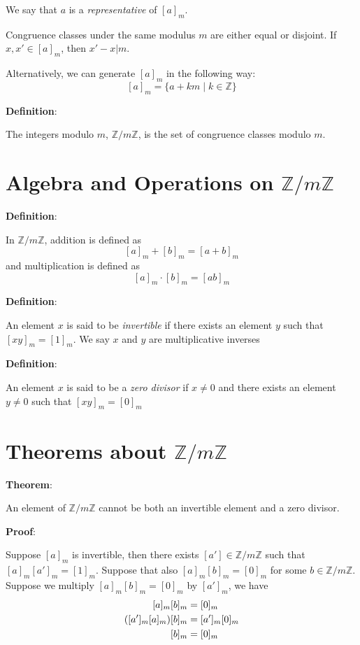 \documentclass{article}
\begin{document}
\begin{multicols*}{2}
We say that $a$ is a \textit{representative} of $[a]_m$. 

Congruence classes under the same modulus $m$ are either equal or disjoint. If $x, x' \in [a]_m$, then $x' - x | m$.

Alternatively, we can generate $[a]_m$ in the following way:\[[a]_m = \{a + km \;|\; k \in \mathbb{Z}\}\]

\textbf{Definition}:

The integers modulo $m$, $\mathbb{Z}/m\mathbb{Z}$, is the set of congruence classes modulo $m$.

\section{Algebra and Operations on $\mathbb{Z}/m\mathbb{Z}$}

\textbf{Definition}:

In $\mathbb{Z}/m\mathbb{Z}$, addition is defined as \[[a]_m+[b]_m = [a+b]_m\]
and multiplication is defined as \[[a]_m \cdot [b]_m = [ab]_m\]

\textbf{Definition}:

An element $x$ is said to be \textit{invertible} if there exists an element $y$ such that $[xy]_m = [1]_m$. We say $x$ and $y$ are multiplicative inverses

\textbf{Definition}:

An element $x$ is said to be a \textit{zero divisor} if $x \neq 0$ and there exists an element $y \neq 0$ such that $[xy]_m = [0]_m$

\section{Theorems about $\mathbb{Z}/m\mathbb{Z}$}

\textbf{Theorem}:

An element of $\mathbb{Z}/m\mathbb{Z}$ cannot be both an invertible element and a zero divisor.

\textbf{Proof}:

Suppose $[a]_m$ is invertible, then there exists $[a'] \in \mathbb{Z}/m\mathbb{Z}$ such that $[a]_m[a']_m = [1]_m$. Suppose that also $[a]_m[b]_m = [0]_m$ for some $ b \in \mathbb{Z}/m\mathbb{Z}$. Suppose we multiply $[a]_m[b]_m = [0]_m$ by $[a']_m$, we have \[\begin{aligned}\relax
[a]_m[b]_m &= [0]_m\\
([a']_m[a]_m)[b]_m &= [a']_m[0]_m\\
[b]_m &= [0]_m
\end{aligned}\]


\end{multicols*}
\end{document}
